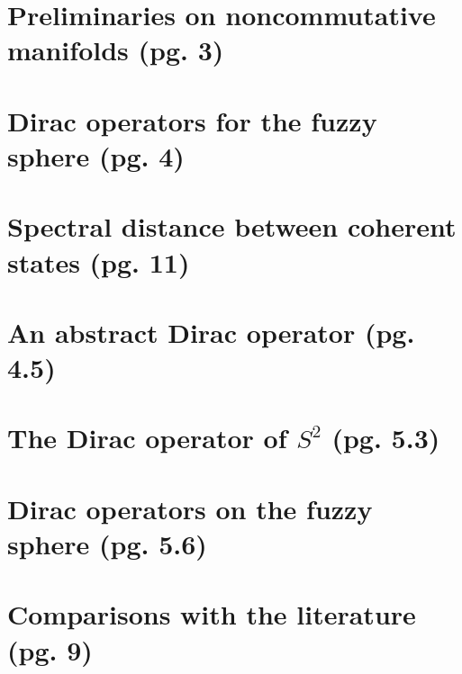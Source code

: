 \documentclass{article}
\begin{document}
\section{Preliminaries on noncommutative manifolds (pg. 3)}

\section{Dirac operators for the fuzzy sphere (pg. 4)}

\section{Spectral distance between coherent states (pg. 11)}

\section{An abstract Dirac operator (pg. 4.5)}

\section{The Dirac operator of $S^2$ (pg. 5.3)}

\section{Dirac operators on the fuzzy sphere (pg. 5.6)}


\section{Comparisons with the literature (pg. 9)}
\end{document}

